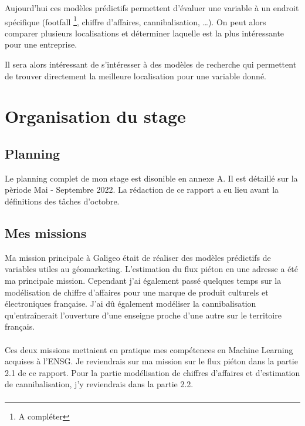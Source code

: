 Aujourd’hui ces modèles prédictifs permettent d’évaluer une variable à un endroit spécifique (footfall \footnote{A compléter}, chiffre d’affaires, cannibalisation, …). On peut alors comparer plusieurs localisations et déterminer laquelle est la plus intéressante pour une entreprise.

Il sera alors intéressant de s’intéresser à des modèles de recherche qui permettent de trouver directement la meilleure localisation pour une variable donné.


\section{Organisation du stage}

\subsection{Planning}

Le planning complet de mon stage est disonible en annexe A. Il est détaillé sur la pèriode Mai - Septembre 2022. La rédaction de ce rapport a eu lieu avant la définitions des tâches d'octobre.

\subsection{Mes missions}

Ma mission principale à Galigeo était de réaliser des modèles prédictifs de variables utiles au géomarketing. L’estimation du flux piéton en une adresse a été ma principale mission. Cependant j’ai également passé quelques temps sur la modélisation de chiffre d’affaires pour une marque de produit culturels et électroniques française. J’ai dû également modéliser la cannibalisation qu’entraînerait l’ouverture d’une enseigne proche d’une autre sur le territoire français.

\paragraph*{}

Ces deux missions mettaient en pratique mes compétences en Machine Learning acquises à l’ENSG. Je reviendrais sur ma mission sur le flux piéton dans la partie 2.1 de ce rapport. Pour la partie modélisation de chiffres d’affaires et d’estimation de cannibalisation, j’y reviendrais dans la partie 2.2.

\paragraph*{}

